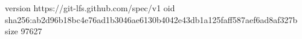 version https://git-lfs.github.com/spec/v1
oid sha256:ab2d96b18bc4e76ad1b3046ae6130b4042e43db1a125faff587aef6ad8af327b
size 97627
